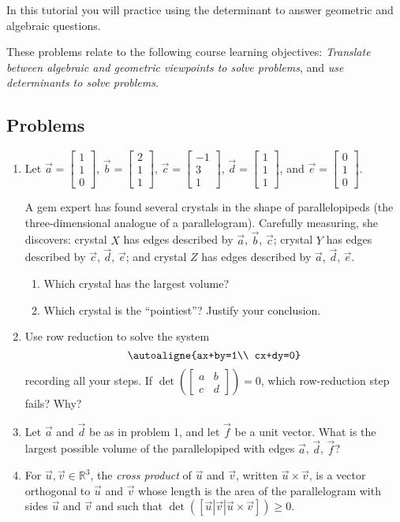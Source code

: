 \documentclass[red]{tutorial}
\newcommand{\R}{\mathbb{R}}
\newcommand{\mat}[1]{\begin{bmatrix}#1\end{bmatrix}}
\theoremstyle{definition}
\theoremstyle{theorem}
\begin{document}
	\begin{tutorial}

	\begin{objectives}
	In this tutorial you will practice using the determinant to answer geometric and algebraic questions.

	These problems relate to the following course learning objectives:
	\textit{Translate between algebraic and geometric viewpoints to solve problems}, and 
		\textit{use determinants to solve problems}.
	\end{objectives}

	\subsection*{Problems}

	\begin{enumerate}
		\item Let $\vec a=\mat{1\\1\\0}$, $\vec b=\mat{2\\1\\1}$, $\vec c=\mat{-1\\3\\1}$,
			$\vec d=\mat{1\\1\\1}$, and $\vec e=\mat{0\\1\\0}$.

			A gem expert has found several crystals in the shape of parallelopipeds (the three-dimensional
			analogue of a parallelogram). Carefully measuring, she discovers:
			crystal $X$ has edges described by $\vec a$, $\vec b$, $\vec c$; crystal $Y$ has edges described by 
			$\vec c$, $\vec d$, $\vec e$;
			and crystal $Z$ has edges described by $\vec a$, $\vec d$, $\vec e$.
			\begin{enumerate}
				\item Which crystal has the largest volume?
				\item Which crystal is the ``pointiest''? Justify your conclusion.
			\end{enumerate}
		\item Use row reduction to solve the system
			\[
				\autoaligne{ax+by=1\\ cx+dy=0}
			\]
			recording all your steps. If $\det\left(\mat{a&b\\c&d}\right)=0$, which row-reduction
			step fails? Why?
		\item Let $\vec a$ and $\vec d$ be as in problem 1, and let $\vec f$ be a unit vector.
			What is the largest possible volume of the parallelopiped with edges $\vec a$, $\vec d$, $\vec f$?
		\item For $\vec u,\vec v\in \R^3$, the \emph{cross product} of $\vec u$ and $\vec v$, written $\vec u\times \vec v$,
			is a vector orthogonal to $\vec u$ and $\vec v$ whose length is the area of the parallelogram
			with sides $\vec u$ and $\vec v$ and such that $\det([\vec u|\vec v|\vec u\times \vec v]) \geq  0$.


\end{enumerate}
\end{tutorial}
\end{document}
